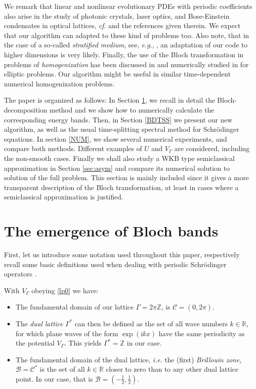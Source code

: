 \documentclass[leqno,final]{siamltex}
\numberwithin{equation}{section}
\newcounter{me}
\begin{document}
We remark that linear and nonlinear evolutionary PDEs with
periodic coefficients also arise in the study of photonic
crystals, laser optics, and Bose-Einstein condensates in optical
lattices, {{\sl cf.\/ }} \cite{Bu, CMS, HFKW} and the references given
therein. We expect that our algorithm can adapted to these kind of
problems too. Also note, that in the case of a so-called
\emph{stratified medium}, see, {{\sl e.g.\/}}, \cite{BLP, BePo}, an
adaptation of our code to higher dimensions is very likely.
Finally, the use of the Bloch transformation in problems of
\emph{homogenization} has been discussed in \cite{COV, CoVa} and
numerically studied in \cite{CSV} for elliptic problems. Our
algorithm might be useful in similar time-dependent numerical
homogenization problems.
{\par}
The paper is organized as follows: In Section \ref{BD}, we recall
in detail the Bloch-decomposition method and we show how to
numerically calculate the corresponding energy bands. Then, in
Section \ref{BDTSS} we present our new algorithm, as well as the
usual time-splitting spectral method for Schr\"odinger equations.
In section \ref{NUM}, we show several numerical experiments, and
compare both methods. Different examples of $U$ and $V_\Gamma$ are
considered, including the non-smooth cases. Finally we shall also
study a WKB type semiclassical approximation in Section
\ref{sec:asym} and compare its numerical solution to solution of
the full problem. This section is mainly included since it gives a
more transparent description of the Bloch transformation, at least
in cases where a semiclassical approximation is justified.

\section{The emergence of Bloch bands }\label{BD}

First, let us introduce some notation used throughout this paper,
respectively recall some basic definitions used when dealing with
periodic Schr\"odinger operators \cite{AsMe, BLP, Te, Wi}.

With $V_\Gamma$ obeying \eqref{lp0} we have:
\begin{itemize}
    \item The fundamental domain of our lattice $\Gamma = 2\pi \mathbb Z$,
is ${\mathcal C} =(0,2\pi)$.
    \item The \emph{dual lattice} ${\Gamma}^*$ can then be defined as the set of
all wave numbers $k \in {{\mathbb R}}$, for which plane waves of the form
$\exp({\mathrm{i}} k x)$ have the same periodicity as the potential $V_{\Gamma}$.
This yields ${\Gamma}^*={{\mathbb Z }}$ in our case.
    \item The fundamental domain of the dual lattice, {{\sl i.e.\/ }} the (first)
\emph{Brillouin zone}, $\mathcal B=\mathcal C^*$ is the set of all
$k\in {{\mathbb R}}$ closer to zero than to any other dual lattice point.
In our case, that is $\mathcal B=\left(-{\frac{{1}}{{2}}},{\frac{{1}}{{2}}}\right)$.
\end{itemize}
\end{document}
